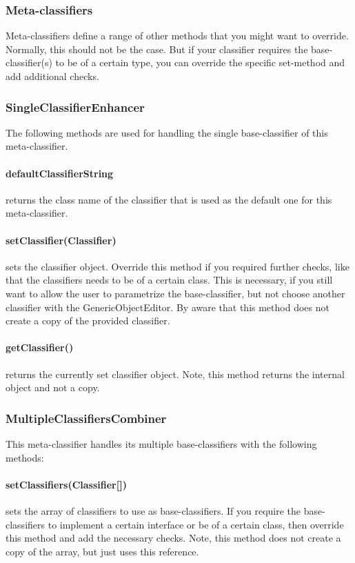\newpage
\subsubsection*{Meta-classifiers}
Meta-classifiers define a range of other methods that you might want to
override. Normally, this should not be the case. But if your classifier requires
the base-classifier(s) to be of a certain type, you can override the specific
set-method and add additional checks.

\subsubsection*{SingleClassifierEnhancer}
The following methods are used for handling the single base-classifier of this
meta-classifier.

\paragraph{defaultClassifierString} returns the class name of the classifier
that is used as the default one for this meta-classifier.

\paragraph{setClassifier(Classifier)} sets the classifier object. Override this
method if you required further checks, like that the classifiers needs to be of
a certain class. This is necessary, if you still want to allow the user to
parametrize the base-classifier, but not choose another classifier with the
GenericObjectEditor. By aware that this method does not create a copy of the
provided classifier.

\paragraph{getClassifier()} returns the currently set classifier object. Note,
this method returns the internal object and not a copy.

\subsubsection*{MultipleClassifiersCombiner}
This meta-classifier handles its multiple base-classifiers with the following
methods:

\paragraph{setClassifiers(Classifier[])} sets the array of classifiers to use
as base-classifiers. If you require the base-classifiers to implement a certain
interface or be of a certain class, then override this method and add the
necessary checks. Note, this method does not create a copy of the array, but
just uses this reference.

